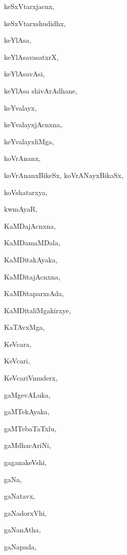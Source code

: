 \begin{multicols}{2}
{keSxVtarxjacnx}, \pageref{keSxVtarxjacnx}

{keSxVtarxshudidhx}, \pageref{keSxVtarxshudidhx}

{keYlAsa}, \pageref{keYlAsa}

{keYlAsavasatxrX}, \pageref{keYlAsavasatxrX}

{keYlAsavAsi}, \pageref{keYlAsavAsi}

{keYlAsa shivArAdhane}, \pageref{keYlAsa shivArAdhane}

{keYvalayx}, \pageref{keYvalayx}

{keYvalayxjAcnxna}, \pageref{keYvalayxjAcnxna}

{keYvalayxliMga}, \pageref{keYvalayxliMga}

{koVrAnanx}, \pageref{koVrAnanx}

{koVrAnanxBikeSx, koVrANayxBikaSx}, \pageref{koVrAnanxBikeSx, koVrANayxBikaSx}

{koVshatarxya}, \pageref{koVshatarxya}

{kwmAyaR}, \pageref{kwmAyaR}

{KaMDajAcnxna}, \pageref{KaMDajAcnxna}

{KaMDamaMDala}, \pageref{KaMDamaMDala}

{KaMDitakAyaka}, \pageref{KaMDitakAyaka}

{KaMDitajAcnxna}, \pageref{KaMDitajAcnxna}

{KaMDitaparxsAda}, \pageref{KaMDitaparxsAda}

{KaMDitaliMgakirxye}, \pageref{KaMDitaliMgakirxye}

{KaTAvxMga}, \pageref{KaTAvxMga}

{KeVcara}, \pageref{KeVcara}

{KeVcari}, \pageref{KeVcari}

{KeVcariVmuderx}, \pageref{KeVcariVmuderx}

{gaMgevALuka}, \pageref{gaMgevALuka}

{gaMTekAyaka}, \pageref{gaMTekAyaka}

{gaMTebaTaTxlu}, \pageref{gaMTebaTaTxlu}

{gaMdhacAriNi}, \pageref{gaMdhacAriNi}

{gaganakeVshi}, \pageref{gaganakeVshi}

{gaNa}, \pageref{gaNa}

{gaNatavx}, \pageref{gaNatavx}

{gaNadorxVhi}, \pageref{gaNadorxVhi}

{gaNanAtha}, \pageref{gaNanAtha}

{gaNapada}, \pageref{gaNapada}


\end{multicols}
